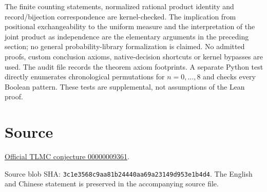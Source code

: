 \documentclass[11pt]{article}
\begin{document}
The finite counting statements, normalized rational product identity and record/bijection correspondence are kernel-checked. The implication from positional exchangeability to the uniform measure and the interpretation of the joint product as independence are the elementary arguments in the preceding section; no general probability-library formalization is claimed.
No admitted proofs, custom conclusion axioms, native-decision shortcuts or
kernel bypasses are used. The audit file records the theorem axiom footprints.
A separate Python test directly enumerates chronological permutations for
$n=0,\ldots,8$ and checks every Boolean pattern. These tests are supplemental,
not assumptions of the Lean proof.
\section*{Source}
\href{https://github.com/The-Last-Math-Competition/The-Last-Math-Competition/blob/main/conjectures/00000009361.md}{Official TLMC conjecture 00000009361}.
\par\smallskip
Source blob SHA: \texttt{3c1e3568c9aa81b24440aa69a23149d953e1b4d4}.
The English and Chinese statement is preserved in the accompanying source file.
\end{document}
